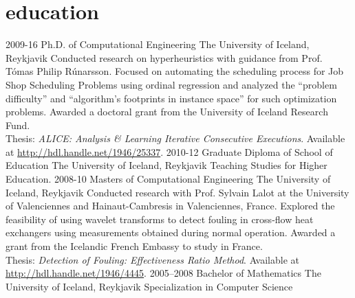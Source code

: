 \section{education}
\begin{entrylist}
\entry
{2009-16}
{Ph.D. {\normalfont of Computational Engineering}}
{The University of Iceland, Reykjavik}
{Conducted research on hyperheuristics with guidance from Prof. Tómas Philip Rúnarsson. Focused on automating the scheduling process for Job Shop Scheduling Problems using ordinal regression and analyzed the ``problem difficulty'' and ``algorithm's footprints in instance space'' for such optimization problems. Awarded a doctoral grant from the University of Iceland Research Fund. \\
{\boldfont Thesis:} \emph{ALICE: Analysis \& Learning Iterative Consecutive Executions}. Available at \url{http://hdl.handle.net/1946/25337}.}
\entry
{2010-12}
{Graduate Diploma {\normalfont of School of Education}}
{The University of Iceland, Reykjavik}
{Teaching Studies for Higher Education.}
\entry
{2008-10}
{Masters {\normalfont of Computational Engineering}}
{The University of Iceland, Reykjavik}
{Conducted research with Prof. Sylvain Lalot at the University of Valenciennes and Hainaut-Cambresis in Valenciennes, France. Explored the feasibility of using wavelet transforms to detect fouling in cross-flow heat exchangers using measurements obtained during normal operation.
Awarded a grant from the Icelandic French Embassy to study in France. \\	
{\boldfont Thesis:} \emph{Detection of Fouling: Effectiveness Ratio Method}. Available at \url{http://hdl.handle.net/1946/4445}.}
\entry
{2005--2008}
{Bachelor {\normalfont of Mathematics}}
{The University of Iceland, Reykjavik}
{Specialization in Computer Science}
\end{entrylist}
